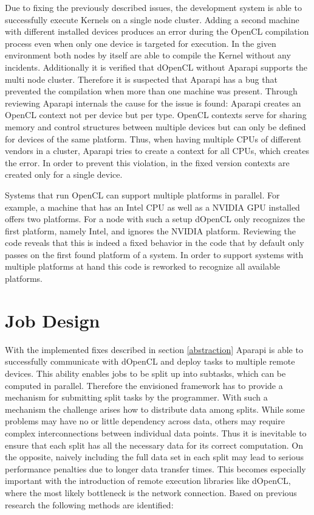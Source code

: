 \begin{description}[style=nextline]
	\item [Failed compilations when using multiple devices]
	Due to fixing the previously described issues, the development system is able to successfully execute Kernels on a single node cluster. Adding a second machine with different installed devices produces an error during the OpenCL compilation process even when only one device is targeted for execution. In the given environment both nodes by itself are able to compile the Kernel without any incidents. Additionally it is verified that dOpenCL without Aparapi supports the multi node cluster. Therefore it is suspected that Aparapi has a bug that prevented the compilation when more than one machine was present. Through reviewing Aparapi internals the cause for the issue is found: Aparapi creates an OpenCL context not per device but per type. OpenCL contexts serve for sharing memory and control structures between multiple devices but can only be defined for devices of the same platform. Thus, when having multiple CPUs of different vendors in a cluster, Aparapi tries to create a context for all CPUs, which creates the error. In order to prevent this violation, in the fixed version contexts are created only for a single device.
	
	\item [Single platform per machine]
	Systems that run OpenCL can support multiple platforms in parallel. For example, a machine that has an Intel CPU as well as a NVIDIA GPU installed offers two platforms. For a node with such a setup dOpenCL only recognizes the first platform, namely Intel, and ignores the NVIDIA platform. Reviewing the code reveals that this is indeed a fixed behavior in the code that by default only passes on the first found platform of a system. In order to support systems with multiple platforms at hand this code is reworked to recognize all available platforms.
	
\end{description} 
 

\section{Job Design}
\label{job_design}
With the implemented fixes described in section \ref{abstraction} Aparapi is able to successfully communicate with dOpenCL and deploy tasks to multiple remote devices. This ability enables jobs to be split up into subtasks, which can be computed in parallel. Therefore the envisioned framework has to provide a mechanism for submitting split tasks by the programmer. With such a mechanism the challenge arises how to distribute data among splits. While some problems may have no or little dependency across data, others may require complex interconnections between individual data points. Thus it is inevitable to ensure that each split has all the necessary data for its correct computation. On the opposite, naively including the full data set in each split may lead to serious performance penalties due to longer data transfer times. This becomes especially important with the introduction of remote execution libraries like dOpenCL, where the most likely bottleneck is the network connection. Based on previous research the following methods are identified:

